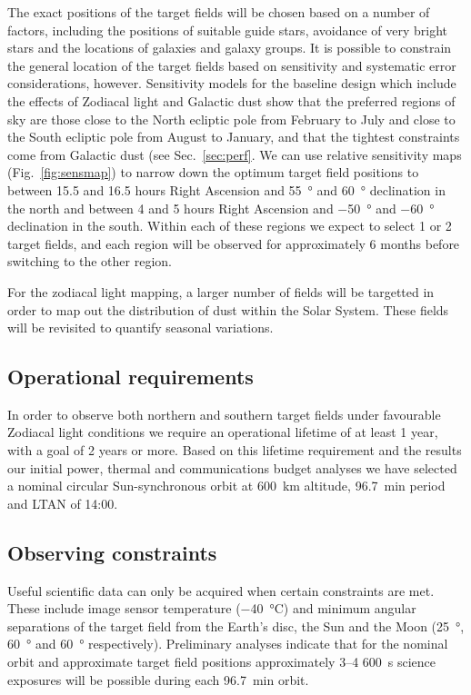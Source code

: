 \documentclass[]{iac}
\begin{document}
The exact positions of the target fields will be chosen based on a number of factors, including the positions of
suitable guide stars, avoidance of very bright stars and the locations of galaxies and galaxy groups. It is possible to
constrain the general location of the target fields based on sensitivity and systematic error considerations, however.
Sensitivity models for the baseline design which include the effects of Zodiacal light and Galactic dust show that the
preferred regions of sky are those close to the North ecliptic pole from February to July and close to the South
ecliptic pole from August to January, and that the tightest constraints come from Galactic dust (see
Sec.~\ref{sec:perf}. We can use relative sensitivity maps (Fig.~\ref{fig:sensmap}) to narrow down the optimum target
field positions to between 15.5 and 16.5 hours Right Ascension and \SI{+55}{\degree} and \SI{+60}{\degree}
declination in the north and between 4 and 5 hours Right Ascension and \SI{-50}{\degree} and \SI{-60}{\degree}
declination in the south. Within each of these regions we
expect to select 1 or 2 target fields, and each region will be observed for approximately 6 months before switching to
the other region.

For the zodiacal light mapping, a larger number of fields will be targetted in order to map out the distribution of dust
within the Solar System. These fields will be revisited to quantify seasonal variations.

\subsection{Operational requirements}

In order to observe both northern and southern target fields under favourable Zodiacal light conditions we require an
operational lifetime of at least 1 year, with a goal of 2 years or more. Based on this lifetime requirement and the
results our initial power, thermal and communications budget analyses we have selected a nominal circular
Sun-synchronous orbit at \SI{600}{\kilo\metre} altitude, \SI{96.7}{\minute} period and LTAN of 14:00.

\subsection{Observing constraints}
\label{sec:obsconst}

Useful scientific data can only be acquired when certain constraints are met. These include image sensor temperature
(\SI{-40}{\celsius}) and minimum angular separations of the target field from the Earth's disc, the Sun and the Moon
(\SI{25}{\degree}, \SI{60}{\degree} and \SI{60}{\degree} respectively). Preliminary analyses indicate that for the
nominal orbit and approximate target field positions approximately 3--4 \SI{600}{\second} science exposures will be
possible during each \SI{96.7}{\minute} orbit.
\end{document}
